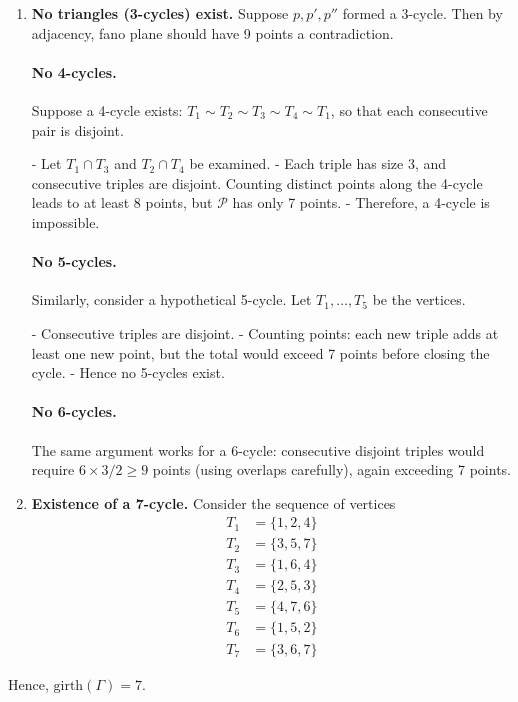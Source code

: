 \documentclass[12pt,a4paper,openany]{book}
\begin{document}
     \begin{enumerate}
    \item \textbf{No triangles (3-cycles) exist.} Suppose $p, p', p''$ formed a 3-cycle. Then by adjacency, fano plane should have 9 points a contradiction.
    
    
    
    \paragraph{ No 4-cycles.}  
Suppose a 4-cycle exists: $T_1 \sim T_2 \sim T_3 \sim T_4 \sim T_1$, so that each consecutive pair is disjoint.  

- Let $T_1 \cap T_3$ and $T_2 \cap T_4$ be examined.  
- Each triple has size 3, and consecutive triples are disjoint. Counting distinct points along the 4-cycle leads to at least $8$ points, but $\mathcal{P}$ has only 7 points.  
- Therefore, a 4-cycle is impossible.

\paragraph{ No 5-cycles.}  
Similarly, consider a hypothetical 5-cycle. Let $T_1,\dots,T_5$ be the vertices.  

- Consecutive triples are disjoint.  
- Counting points: each new triple adds at least one new point, but the total would exceed 7 points before closing the cycle.  
- Hence no 5-cycles exist.

\paragraph{ No 6-cycles.}  
The same argument works for a 6-cycle: consecutive disjoint triples would require $6 \times 3 / 2 \ge 9$ points (using overlaps carefully), again exceeding 7 points.  


    
    \item \textbf{Existence of a 7-cycle.} Consider the sequence of vertices
    \begin{align*}
T_1 &= \{1,2,4\} \\
T_2 &= \{3,5,7\} \\
T_3 &= \{1,6,4\} \\
T_4 &= \{2,5,3\} \\
T_5 &= \{4,7,6\} \\
T_6 &= \{1,5,2\} \\
T_7 &= \{3,6,7\}
\end{align*}
   
\end{enumerate}
Hence, $\mathrm{girth}(\Gamma) = 7$.
\end{document}
